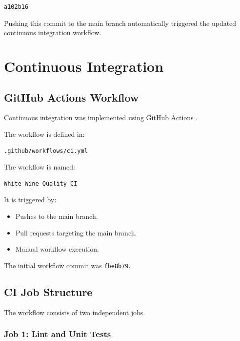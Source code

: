 \documentclass[11pt,a4paper]{article}
\begin{document}
\begin{lstlisting}
a102b16
\end{lstlisting}

Pushing this commit to the main branch automatically
triggered the updated continuous integration workflow.


\section{Continuous Integration}

\subsection{GitHub Actions Workflow}

Continuous integration was implemented using
GitHub Actions \cite{actions}.

The workflow is defined in:

\begin{lstlisting}
.github/workflows/ci.yml
\end{lstlisting}

The workflow is named:

\begin{lstlisting}
White Wine Quality CI
\end{lstlisting}

It is triggered by:

\begin{itemize}
    \item Pushes to the main branch.
    \item Pull requests targeting the main branch.
    \item Manual workflow execution.
\end{itemize}

The initial workflow commit was \texttt{fbe8b79}.

\subsection{CI Job Structure}

The workflow consists of two independent jobs.

\subsubsection*{Job 1: Lint and Unit Tests}
\end{document}
